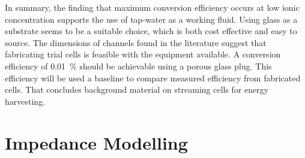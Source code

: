 

    In summary, the finding that maximum conversion efficiency occurs at low ionic concentration supports the use of tap-water as a working fluid.
    Using glass as a substrate seems to be a suitable choice, which is both cost effective and easy to source.
    The dimensions of channels found in the literature suggest that fabricating trial cells is feasible with the equipment available.
    A conversion efficiency of \SI{0.01}{\percent} should be achievable using a porous glass plug.
    This efficiency will be used a baseline to compare measured efficiency from fabricated cells.
    That concludes background material on streaming cells for energy harvesting.


\section{Impedance Modelling}
  \label{sect:background_impedanceModelling}

